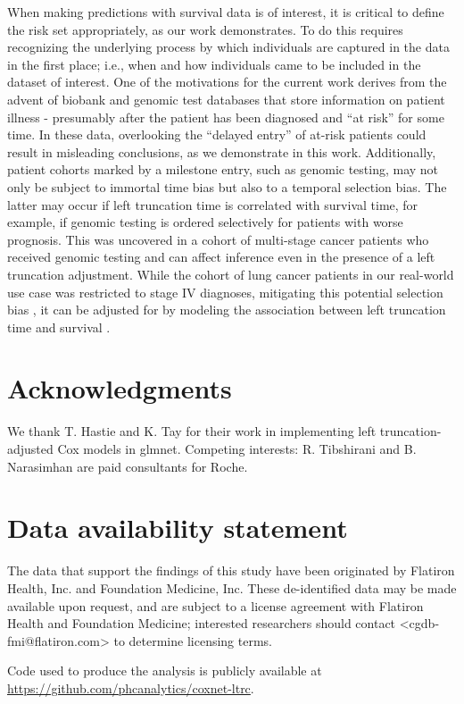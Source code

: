 \documentclass[11pt,final,fleqn]{article}\usepackage[]{graphicx}\usepackage[]{color}
\theoremstyle{plain}
\newcommand{\pkg}[1]{{\fontseries{b}\selectfont #1}}
\begin{document}
When making predictions with survival data is of interest, it is critical to define the risk set appropriately, as our work demonstrates. To do this requires recognizing the underlying process by which individuals are captured in the data in the first place; i.e., when and how individuals came to be included in the dataset of interest. One of the motivations for the current work derives from the advent of biobank and genomic test databases that store information on patient illness - presumably after the patient has been diagnosed and ``at risk'' for some time. In these data, overlooking the ``delayed entry'' of at-risk patients could result in misleading conclusions, as we demonstrate in this work. Additionally, patient cohorts marked by a milestone entry, such as genomic testing, may not only be subject to immortal time bias but also to a temporal selection bias. The latter may occur if left truncation time is correlated with survival time, for example, if genomic testing is ordered selectively for patients with worse prognosis. This was uncovered in a cohort of multi-stage cancer patients who received genomic testing \cite{kehl2020selectionbias} and can affect inference even in the presence of a left truncation adjustment. While the cohort of lung cancer patients in our real-world use case was restricted to stage IV diagnoses, mitigating this potential selection bias \cite{kehl2020selectionbias}, it can be adjusted for by modeling the association between left truncation time and survival \cite{thiebaut2004choice, chiou2019transformation}.

\section*{Acknowledgments} 
We thank T. Hastie and K. Tay for their work in implementing left truncation-adjusted Cox models in \pkg{glmnet}. 
Competing interests: R. Tibshirani and B. Narasimhan are paid consultants for Roche. 

\section*{Data availability statement}
The data that support the findings of this study have been originated by Flatiron Health, Inc. and Foundation Medicine, Inc. These de-identified data may be made available upon request, and are subject to a license agreement with Flatiron Health and Foundation Medicine; interested researchers should contact <cgdb-fmi@flatiron.com> to determine licensing terms.

Code used to produce the analysis is publicly available at \url{https://github.com/phcanalytics/coxnet-ltrc}.


\end{document}
